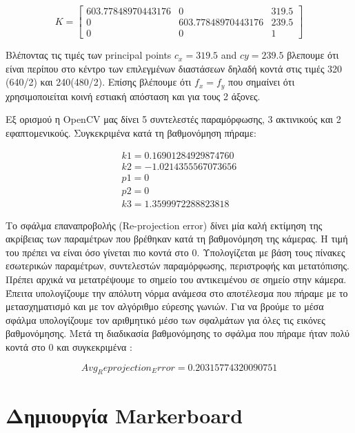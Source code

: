 \begin{equation}
K=
\begin{bmatrix}
603.77848970443176 & 0 & 319.5\\
0 & 603.77848970443176 & 239.5\\
0 & 0 & 1
\end{bmatrix}
\end{equation}

Βλέποντας τις τιμές των principal points $c_{x}=319.5$ and $c{y}=239.5$ βλεπουμε ότι είναι περίπου στο κέντρο των επιλεγμένων διαστάσεων δηλαδή κοντά στις τιμές  320 (640/2) και 240(480/2). Επίσης βλέπουμε ότι $f_{x}=f_{y}$ που σημαίνει ότι χρησιμοποιείται κοινή εστιακή απόσταση και για τους 2 άξονες.


Εξ ορισμού η OpenCV μας δίνει 5 συντελεστές παραμόρφωσης, 3 ακτινικούς και 2 εφαπτομενικούς. Συγκεκριμένα κατά τη βαθμονόμηση πήραμε:

\begin{equation}
\begin{aligned}
k1= 0.16901284929874760\\
k2= -1.0214355567073656\\
p1= 0\\
p2= 0\\
k3= 1.3599972288823818 
\end{aligned}
\end{equation}

Το σφάλμα επαναπροβολής (Re-projection error) δίνει μία καλή εκτίμηση της ακρίβειας των παραμέτρων που βρέθηκαν κατά τη βαθμονόμηση της κάμερας. Η τιμή του πρέπει να είναι όσο γίνεται πιο κοντά στο 0. Υπολογίζεται με βάση τους πίνακες εσωτερικών παραμέτρων, συντελεστών παραμόρφωσης, περιστροφής και μετατόπισης. Πρέπει αρχικά να μετατρέψουμε το σημείο του αντικειμένου σε σημείο στην κάμερα. Έπειτα υπολογίζουμε την απόλυτη νόρμα ανάμεσα στο αποτέλεσμα που πήραμε με το μετασχηματισμό και με τον αλγόριθμο εύρεσης γωνιών. Για να βρούμε το μέσα σφάλμα υπολογίζουμε τον αριθμητικό μέσο των σφαλμάτων για όλες τις εικόνες βαθμονόμησης. Μετά τη διαδικασία βαθμονόμησης το σφάλμα που πήραμε ήταν πολύ κοντά στο 0 και συγκεκριμένα :

\begin{equation}
Avg_Reprojection_Error = 0.20315774320090751
\end{equation}


\section{Δημιουργία Markerboard}

